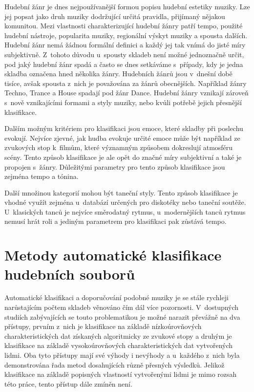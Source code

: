 Hudební žánr je dnes nejpoužívanější formou popisu hudební estetiky muziky. Lze jej popsat jako druh muziky dodržující určitá pravidla, přijímaný nějakou komunitou. Mezi vlastnosti charakterizující hudební žánry patří tempo, použité hudební nástroje, popularita muziky, regionální výskyt muziky a spousta dalších. Hudební žánr nemá žádnou formální definici a každý jej tak vnímá do jisté míry subjektivně. Z~tohoto důvodu u~spousty skladeb není možné jednoznačně určit, pod jaký hudební žánr spadá a často se dnes setkáváme s~případy, kdy je jedna skladba označena hned několika žánry. Hudebních žánrů jsou v~dnešní době tisíce, avšak spousta z~nich je považována za  žánrů obecnějších. Například žánry Techno, Trance a House spadají pod žánr Dance. Hudební žánry vznikají zároveň s~nově vznikajícími formami a styly muziky, nebo kvůli potřebě jejich přesnější klasifikace.\cite{genre}\cite{aca}

Dalším možným kritériem pro klasifikaci jsou emoce, které skladby při poslechu evokují. Nejvíce zjevné, jak hudba evokuje určité emoce může být například ze zvukových stop k~filmům, které významným způsobem dokreslují atmosféru scény. Tento způsob klasifikace je ale opět do značné míry subjektivní a také je propojen s~žánry. Důležitými parametry pro tento způsob klasifikace jsou zejména tempo a tónina.\cite{5202572}\cite{aca}

Další množinou kategorií mohou být taneční styly. Tento způsob klasifikace je vhodné využít zejména u~databází určených pro diskotéky nebo taneční soutěže. U~klasických tanců je nejvíce směrodatný rytmus, u~modernějších tanců rytmus nemusí hrát roli a jediným parametrem pro klasifikaci pak zůstává tempo.

\section{Metody automatické klasifikace hudebních souborů}
\label{metody_automaticke_klasifikace_hudebnich_skladeb}
Automatické klasifikaci a doporučování podobné muziky je se stále rychleji narůstajícím počtem skladeb věnováno čím dál více pozornosti. V~dostupných studiích zabývajících se touto problematikou je možné narazit převážně na dva přístupy, prvním z~nich je klasifikace na základě nízkoúrovňových charakteristických dat získaných algoritmicky ze zvukové stopy a druhým je klasifikace na základě vysokoúrovňových charakteristických dat vytvořených lidmi. Oba tyto přístupy mají své výhody i nevýhody a u~každého z~nich byla demonstrována řada metod dosahujících různě přesných výsledků. Jelikož klasifikace na základě popisných vlastností vytvořenými lidmi je mimo rozsah této práce, tento přístup dále zmíněn není.

